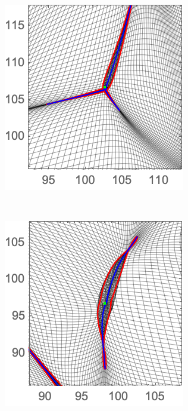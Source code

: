 \documentclass[a4paper, 11pt]{article}
\begin{document}
\begin{figure}
\begin{subfigure}[b]{0.24\textwidth}
\end{subfigure}~
\begin{subfigure}[b]{0.24\textwidth}
\includegraphics[width=\textwidth]{Hyperbolic_Z_Zoom}
\end{subfigure}\\
\begin{subfigure}[b]{0.24\textwidth}
\includegraphics[width=\textwidth]{Cusp_Nb_Zoom}

\end{subfigure}
\end{figure}
\end{document}
